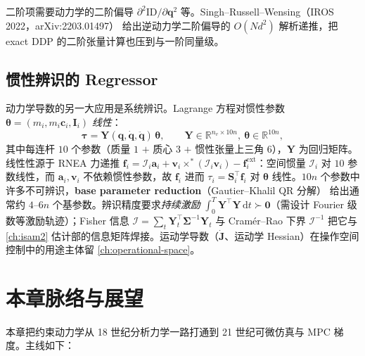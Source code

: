 二阶项需要动力学的二阶偏导 $\partial^2\mathrm{ID}/\partial\mathbf q^2$ 等。Singh--Russell--Wensing（IROS 2022，arXiv:2203.01497）\cite{singh2022second} 给出逆动力学二阶偏导的 $O(Nd^2)$ 解析递推，把 exact DDP 的二阶张量计算也压到与一阶同量级。

\subsection{惯性辨识的 Regressor}
动力学导数的另一大应用是系统辨识。Lagrange 方程对惯性参数 $\boldsymbol\theta=(m_i,m_i\mathbf c_i,\mathbf I_i)$ \emph{线性}：
\begin{equation}
  \boldsymbol\tau=\mathbf Y(\mathbf q,\dot{\mathbf q},\ddot{\mathbf q})\,\boldsymbol\theta,\qquad \mathbf Y\in\mathbb R^{n_v\times10n},\ \boldsymbol\theta\in\mathbb R^{10n},
  \label{eq:cd-regressor}
\end{equation}
其中每连杆 $10$ 个参数（质量 $1$ $+$ 质心 $3$ $+$ 惯性张量上三角 $6$），$\mathbf Y$ 为回归矩阵。线性性源于 RNEA 力递推 $\mathbf f_i=\mathcal I_i\mathbf a_i+\mathbf v_i\times^*(\mathcal I_i\mathbf v_i)-\mathbf f_i^{\text{ext}}$：空间惯量 $\mathcal I_i$ 对 $10$ 参数线性，而 $\mathbf a_i,\mathbf v_i$ 不依赖惯性参数，故 $\mathbf f_i$ 进而 $\tau_i=\mathbf S_i^\top\mathbf f_i$ 对 $\boldsymbol\theta$ 线性。$10n$ 个参数中许多不可辨识，\textbf{base parameter reduction}（Gautier--Khalil QR 分解）\cite{khalil2002modeling} 给出通常约 $4$–$6n$ 个基参数。辨识精度要求\emph{持续激励} $\int_0^T\mathbf Y^\top\mathbf Y\,\mathrm dt\succ\mathbf 0$（需设计 Fourier 级数等激励轨迹）；Fisher 信息 $\mathcal I=\sum_t\mathbf Y_t^\top\boldsymbol\Sigma^{-1}\mathbf Y_t$ 与 Cramér--Rao 下界 $\mathcal I^{-1}$ 把它与 \cref{ch:isam2} 估计部的信息矩阵焊接。运动学导数（$\dot{\mathbf J}$、运动学 Hessian）在操作空间控制中的用途主体留 \cref{ch:operational-space}。

\section{本章脉络与展望}
\label{sec:cd-outlook}

本章把约束动力学从 18 世纪分析力学一路打通到 21 世纪可微仿真与 MPC 梯度。主线如下：

